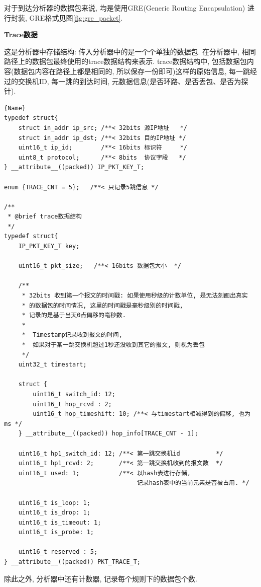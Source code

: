 对于到达分析器的数据包来说, 均是使用GRE(Generic Routing Encapsulation)
进行封装, GRE格式见图\ref{fig:gre_packet}.

\textbf{Trace数据}

这是分析器中存储结构: 传入分析器中的是一个个单独的数据包.
在分析器中, 相同路径上的数据包最终使用的trace数据结构来表示. trace数据结构中,
包括数据包内容(数据包内容在路径上都是相同的, 所以保存一份即可)这样的原始信息,
每一跳经过的交换机ID, 每一跳的到达时间, 元数据信息(是否环路、是否丢包、是否为探针).

\label{trace数据结构}
\begin{lstlisting}[caption=Trace数据结构,frame=tlrb]{Name}
typedef struct{
    struct in_addr ip_src; /**< 32bits 源IP地址   */
    struct in_addr ip_dst; /**< 32bits 目的IP地址 */
    uint16_t ip_id;        /**< 16bits 标识符     */
    uint8_t protocol;      /**< 8bits  协议字段   */
} __attribute__((packed)) IP_PKT_KEY_T;

enum {TRACE_CNT = 5};   /**< 只记录5跳信息 */

/**
 * @brief trace数据结构
 */
typedef struct{
    IP_PKT_KEY_T key;

    uint16_t pkt_size;   /**< 16bits 数据包大小  */

    /**
     * 32bits 收到第一个报文的时间戳: 如果使用秒级的计数单位, 是无法刻画出真实
     * 的数据包的时间情况, 这里的时间戳是毫秒级别的时间戳,
     * 记录的是基于当天0点偏移的毫秒数.
     *
     *  Timestamp记录收到报文的时间,
     *  如果对于某一跳交换机超过1秒还没收到其它的报文, 则视为丢包
     */
    uint32_t timestart;

    struct {
        uint16_t switch_id: 12;
        uint16_t hop_rcvd : 2;
        uint16_t hop_timeshift: 10; /**< 与timestart相减得到的偏移, 也为ms */
    } __attribute__((packed)) hop_info[TRACE_CNT - 1];

    uint16_t hp1_switch_id: 12; /**< 第一跳交换机id          */
    uint16_t hp1_rcvd: 2;       /**< 第一跳交换机收到的报文数  */
    uint16_t used: 1;           /**< 以hash表进行存储,
                                     记录hash表中的当前元素是否被占用. */

    uint16_t is_loop: 1;
    uint16_t is_drop: 1;
    uint16_t is_timeout: 1;
    uint16_t is_probe: 1;

    uint16_t reserved : 5;
} __attribute__((packed)) PKT_TRACE_T;
\end{lstlisting}


除此之外, 分析器中还有计数器, 记录每个规则下的数据包个数.

